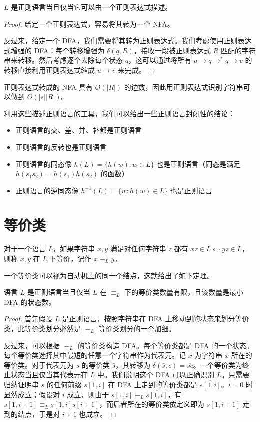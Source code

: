 \begin{theorem}
    $L$ 是正则语言当且仅当它可以由一个正则表达式描述。
\end{theorem}
\begin{proof}
    给定一个正则表达式，容易将其转为一个 NFA。

    反过来，给定一个 DFA，我们需要将其转为正则表达式。我们考虑使用正则表达式增强的 DFA：每个转移增强为 $\delta(q,R)$，接收一段被正则表达式 $R$ 匹配的字符串来转移。然后考虑逐个去除每个状态 $q$，这可以通过将所有 $u\to q\to^* q\to v$ 的转移直接利用正则表达式缩成 $u\to v$ 来完成。
\end{proof}

正则表达式转成的 NFA 具有 $O(|R|)$ 的边数，因此用正则表达式识别字符串可以做到 $O(|s||R|)$。

利用这些描述正则语言的工具，我们可以给出一些正则语言封闭性的结论：
\begin{theorem}
    \begin{itemize}
        \item 正则语言的交、差、并、补都是正则语言
        \item 正则语言的反转也是正则语言
        \item 正则语言的同态像 $h(L)=\{h(w):w\in L\}$ 也是正则语言（同态是满足 $h(s_1s_2)=h(s_1)h(s_2)$ 的函数）
        \item 正则语言的逆同态像 $h^{-1}(L)=\{w:h(w)\in L\}$ 也是正则语言
    \end{itemize}
\end{theorem}

\section{等价类}

\begin{definition}
    对于一个语言 $L$，如果字符串 $x,y$ 满足对任何字符串 $z$ 都有 $xz\in L\Longleftrightarrow yz\in L$，则称 $x,y$ 在 $L$ 下等价，记作 $x\equiv_L y$。
\end{definition}

一个等价类可以视为自动机上的同一个结点，这就给出了如下定理。

\begin{theorem}
    语言 $L$ 是正则语言当且仅当 $L$ 在 $\equiv_L$ 下的等价类数量有限，且该数量是最小 DFA 的状态数。
\end{theorem}
\begin{proof}
    首先假设 $L$ 是正则语言，按照字符串在 DFA 上移动到的状态来划分等价类，此等价类划分必然是 $\equiv_L$ 等价类划分的一个加细。

    反过来，可以根据 $\equiv_L$ 的等价类构造 DFA。每个等价类都是 DFA 的一个状态。每个等价类选择其中最短的任意一个字符串作为代表元。记 $\bar x$ 为字符串 $x$ 所在的等价类。对于代表元为 $s$ 的等价类 $\bar s$，其转移为 $\delta(\bar s,c)=\overline{sc}$。一个等价类为终止状态当且仅当其代表元在 $L$ 中。我们说明这个 DFA 可以正确识别 $L$。只需要归纳证明串 $s$ 的任何前缀 $s[1,i]$ 在 DFA 上走到的等价类都是 $\overline{s[1,i]}$。$i=0$ 时显然成立；假设对 $i$ 成立，则由于 $s[1,i]\equiv_L \overline{s[1,i]}$，有 $s[1,i+1]\equiv_L \overline{s[1,i]}s[i+1]$，而后者所在的等价类依定义即为 $s[1,i+1]$ 走到的结点，于是对 $i+1$ 也成立。
\end{proof}

